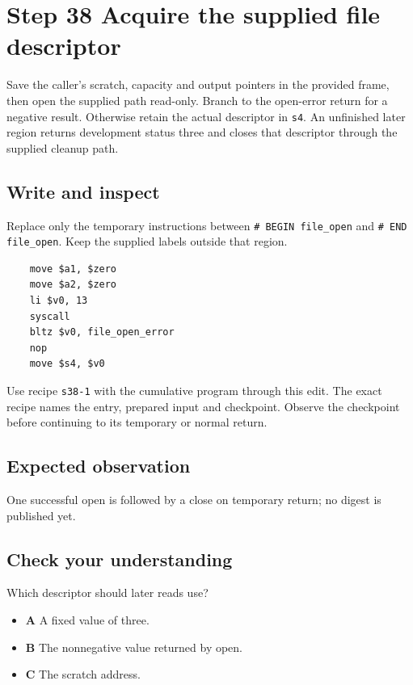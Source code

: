 \section{Step 38 Acquire the supplied file descriptor}\label{sha-s38}

Save the caller's scratch, capacity and output pointers in the provided frame, then open the supplied path read-only. Branch to the open-error return for a negative result. Otherwise retain the actual descriptor in \texttt{s4}. An unfinished later region returns development status three and closes that descriptor through the supplied cleanup path.

\subsection{Write and inspect}
Replace only the temporary instructions between \texttt{\# BEGIN file\_open} and \texttt{\# END file\_open}. Keep the supplied labels outside that region.

\begin{verbatim}
    move $a1, $zero
    move $a2, $zero
    li $v0, 13
    syscall
    bltz $v0, file_open_error
    nop
    move $s4, $v0
\end{verbatim}

Use recipe \texttt{s38-1} with the cumulative program through this edit. The exact recipe names the entry, prepared input and checkpoint. Observe the checkpoint before continuing to its temporary or normal return.

\subsection{Expected observation}
One successful open is followed by a close on temporary return; no digest is published yet.

\subsection{Check your understanding}
Which descriptor should later reads use?

\begin{itemize}
  \item \textbf{A} A fixed value of three.
  \item \textbf{B} The nonnegative value returned by open.
  \item \textbf{C} The scratch address.
\end{itemize}

